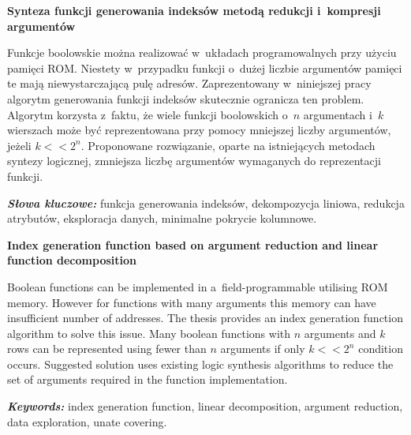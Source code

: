 \newpage
\vspace{10cm}

\newpage
\begin{center}
	\textbf{Synteza funkcji generowania indeksów metodą redukcji i~kompresji argumentów}
\end{center}

Funkcje boolowskie można realizować w~układach programowalnych przy użyciu pamięci ROM.
Niestety w~przypadku funkcji o~dużej liczbie argumentów pamięci te mają niewystarczającą pulę adresów.
Zaprezentowany w~niniejszej pracy algorytm generowania funkcji indeksów skutecznie ogranicza ten problem.
Algorytm korzysta z~faktu,
że wiele funkcji boolowskich o~$n$ argumentach i~$k$ wierszach może być reprezentowana przy pomocy mniejszej liczby argumentów,
jeżeli $k<<2^n$.
Proponowane rozwiązanie,
oparte na istniejących metodach syntezy logicznej,
zmniejsza liczbę argumentów wymaganych do reprezentacji funkcji.

\textit{\textbf{Słowa kluczowe:}} funkcja generowania indeksów, dekompozycja liniowa, redukcja atrybutów, eksploracja danych, minimalne pokrycie kolumnowe.

	\vspace{1cm}

\begin{center}
    \textbf{Index generation function based on argument reduction and linear function decomposition}
\end{center}

Boolean functions can be implemented in a~field-programmable utilising ROM memory.
However for functions with many arguments this memory can have insufficient number of addresses.
The thesis provides an index generation function algorithm to solve this issue.
Many boolean functions with $n$ arguments and $k$ rows can be represented using fewer than $n$ arguments if only $k<<2^n$ condition occurs.
Suggested solution uses existing logic synthesis algorithms to reduce the set of arguments required in the function implementation.

\textit{\textbf{Keywords:}} index generation function, linear decomposition, argument reduction, data exploration, unate covering.

\cleardoublepage
